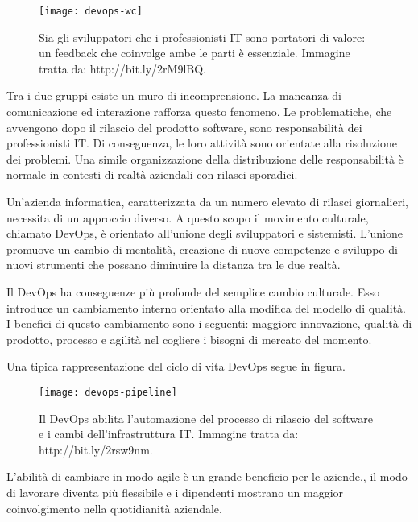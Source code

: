 \begin{figure}[htbp]
	\begin{center}
		\texttt{[image: devops-wc]}
		\caption{Sia gli sviluppatori che i professionisti IT sono 
			     portatori di valore: un feedback che coinvolge ambe 
			     le parti è essenziale. Immagine tratta da: http://bit.ly/2rM9lBQ.}
	\end{center}
\end{figure}


Tra i due gruppi esiste un muro di incomprensione. La mancanza di comunicazione 
ed interazione rafforza questo fenomeno. Le problematiche, che avvengono dopo il 
rilascio del prodotto software, sono responsabilità dei professionisti IT. 
Di conseguenza, le loro attività sono orientate alla risoluzione dei problemi. 
Una simile organizzazione della distribuzione delle responsabilità è normale 
in contesti di realtà aziendali con rilasci sporadici.  

Un'azienda informatica, caratterizzata da un numero elevato di rilasci 
giornalieri, necessita di un approccio diverso. A questo scopo il movimento 
culturale, chiamato DevOps, è orientato all'unione degli sviluppatori e sistemisti. 
L'unione promuove un cambio di mentalità, creazione di nuove competenze e 
sviluppo di nuovi strumenti che possano diminuire la distanza tra le due realtà. 

Il DevOps ha conseguenze più profonde del semplice cambio culturale.  
Esso introduce un cambiamento interno orientato alla modifica del modello 
di qualità. I benefici di questo cambiamento sono i seguenti: maggiore 
innovazione, qualità di prodotto, processo e agilità nel cogliere i bisogni 
di mercato del momento.

Una tipica rappresentazione del ciclo di vita DevOps segue in figura. 

\begin{figure}[htbp]
	\begin{center}
		\texttt{[image: devops-pipeline]}
		\caption{Il DevOps abilita l'automazione del processo di 
rilascio del software e i cambi dell'infrastruttura IT. Immagine tratta da: 
http://bit.ly/2rsw9nm.}
	\end{center}
\end{figure}

L'abilità di cambiare in modo agile è un grande beneficio per le aziende., il 
modo di lavorare diventa più flessibile e i dipendenti mostrano un maggior 
coinvolgimento nella quotidianità aziendale.    

